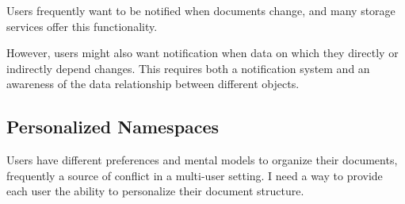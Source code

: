 Users frequently want to be notified when documents change, and many storage
services offer this functionality.

However, users might also want notification when data on which they directly or
indirectly depend changes. This requires both a notification system and an
awareness of the data relationship between different objects.

\subsection{Personalized Namespaces}

Users have different preferences and mental models to organize their documents,
frequently a source of conflict in a multi-user setting. I need a way to provide each user
the ability to personalize their document structure.

